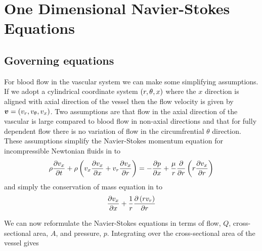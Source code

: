 \section{One Dimensional Navier-Stokes Equations}
\label{sec:OneDNavierStokesEquations}

\subsection{Governing equations}
\label{subsec:OneDNSGoverningEquations}

For blood flow in the vascular system we can make some simplifying
assumptions. If we adopt a cylindrical coordinate system
$\left( r,\theta,x \right)$ where the $x$ direction is aligned with axial
direction of the vessel then the flow velocity is given by
$ \boldsymbol{v} =\left( v_{r},v_{\theta},v_{x} \right)$. Two assumptions are that
flow in the axial direction of the vascular is large compared to blood
flow in non-axial directions and that for fully dependent flow there
is no variation of flow in the circumfrential $\theta$
direction. These assumptions simplify the Navier-Stokes momentum
equation for incompressible Newtonian fluids in
 to
\begin{equation}
  \rho\delby{v_{x}}{t}+\rho\pbrac{v_{x}\delby{v_{x}}{x}+v_{r}\delby{v_{x}}{r}}=
  -\delby{p}{x}+\dfrac{\mu}{r}\delby{}{r}\pbrac{r\delby{v_{x}}{r}}
  \label{eqn:OneDNSIncompNewtonianMomentum}
\end{equation}
and simply the conservation of mass equation in  to
\begin{equation}
  \delby{v_{x}}{x}+\dfrac{1}{r}\delby{\pbrac{r v_{r}}}{r}
  \label{eqn:OneDNSIncompMass}
\end{equation}

We can now reformulate the \onedal Navier-Stokes equations in terms of
flow, $Q$, cross-sectional area, $A$, and pressure, $p$. Integrating
 over the cross-sectional
area of the vessel gives



